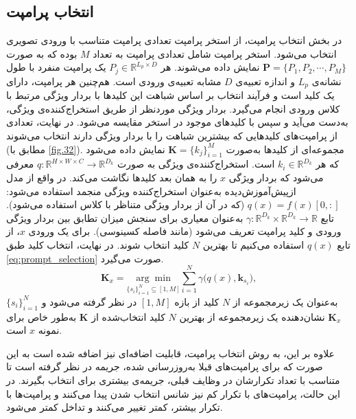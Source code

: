 \subsection{انتخاب پرامپت}
در بخش انتخاب پرامپت، از استخر پرامپت تعدادی پرامپت متناسب با ورودی تصویری انتخاب می‌شود. استخر پرامپت شامل تعدادی پرامپت به تعداد $M$ بوده که به صورت \(\mathbf{P} = \{ P_{1}, P_{2}, \cdots, P_{M} \}\) نمایش داده‌ می‌شوند. هر \( P_j \in \mathbb{R}^{L_p \times D} \) یک پرامپت منفرد با طول نشانه‌ی \( L_p \) و اندازه تعبیه‌ی $D$  مشابه تعبیه‌ی ورودی است. هم‌چنین هر پرامپت، دارای یک کلید است و فرآیند انتخاب بر اساس شباهت این کلیدها با بردار ویژگی مرتبط با کلاس ورودی انجام می‌گیرد. بردار ویژگی موردنظر از طریق استخراج‌کننده‌ی ویژگی، به‌دست می‌آید و سپس با کلیدهای موجود در استخر مقایسه می‌شود. در نهایت، تعدادی از پرامپت‌های کلیدهایی که بیشترین شباهت را با بردار ویژگی دارند انتخاب می‌شوند (مطابق با \cref{fig.32}). مجموعه‌ای از کلیدها به‌صورت 
\(\mathbf{K} = \{k_{j}\}_{i=1}^{M}\) 
نمایش داده می‌شود که هر \(k_i \in \mathbb{R}^{D_k}\) است. استخراج‌کننده‌ی ویژگی به صورت  \( q : \mathbb{R}^{H \times W \times C} \to \mathbb{R}^{D_k} \) معرفی می‌شود که بردار ویژگی \(x\) را به همان بعد کلیدها نگاشت می‌کند. در واقع از مدل ازپیش‌آموزش‌دیده به‌عنوان استخراج‌کننده ویژگی منجمد  استفاده می‌شود:
\( q(x) = f(x)[0,:] \)
(که در آن از بردار ویژگی متناظر با کلاس استفاده می‌شود). 
تابع \(\gamma : \mathbb{R}^{D_k} \times \mathbb{R}^{D_k} \to \mathbb{R}\) به‌عنوان معیاری برای سنجش میزان تطابق بین بردار ویژگی ورودی و کلید پرامپت تعریف می‌شود (مانند فاصله کسینوسی). برای یک ورودی \(x\)، از تابع \(q(x)\) استفاده می‌کنیم تا بهترین \(N\) کلید انتخاب شوند. در نهایت، انتخاب کلید طبق \eqref{eq:prompt_selection} صورت می‌گیرد.
\begin{equation}\label{eq:prompt_selection}
	\mathbf{K}_x = 
	\underset{\{s_i\}_{i=1}^{N} \subseteq [1, M]}{\arg\min} 
	\sum_{i=1}^{N} \gamma \big( q(x), \mathbf{k}_{s_i} \big),
\end{equation}
\(\{s_i\}_{i=1}^{N}\) به‌عنوان یک زیرمجموعه از \(N\) کلید از بازه \([1, M]\) در نظر گرفته می‌شود
و \( \mathbf{K}_x \) نشان‌دهنده یک زیرمجموعه از بهترین \( N \) کلید انتخاب‌شده از \( \mathbf{K} \) به‌طور خاص برای نمونه \( x \) است.

علاوه بر این، به روش انتخاب پرامپت، قابلیت اضافه‌ای نیز اضافه شده است به این صورت که برای پرامپت‌های قبلا به‌روزرسانی شده، جریمه در نظر گرفته است تا متناسب با تعداد تکرارشان در وظایف قبلی، جریمه‌ی بیشتری برای انتخاب بگیرند. در این حالت، پرامپت‌های با تکرار کم نیز شانس انتخاب شدن پیدا می‌کنند و پرامپت‌ها با تکرار بیشتر، کمتر تغییر می‌کنند و تداخل کمتر می‌شود.
